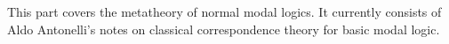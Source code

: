 \documentclass[../../include/open-logic-part]{subfiles}
\begin{document}

\begin{editorial}
  This part covers the metatheory of normal modal logics. It currently
  consists of Aldo Antonelli's notes on classical correspondence
  theory for basic modal logic.
\end{editorial}







\OLEndPartHook
\end{document}
